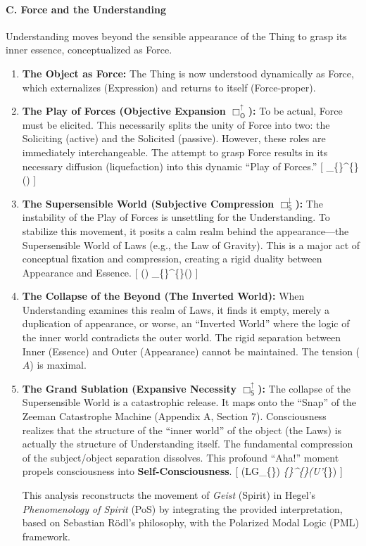 \paragraph{C. Force and the Understanding}\label{c.-force-and-the-understanding}

Understanding moves beyond the sensible appearance of the Thing to grasp its inner essence, conceptualized as Force.

\begin{enumerate}
\def\labelenumi{\arabic{enumi}.}
\item
  \textbf{The Object as Force:} The Thing is now understood dynamically as Force, which externalizes (Expression) and returns to itself (Force-proper).
\item
  \textbf{The Play of Forces (Objective Expansion \(\Box_{\mathsf{O}}^{\uparrow}\)):} To be actual, Force must be elicited. This necessarily splits the unity of Force into two: the Soliciting (active) and the Solicited (passive). However, these roles are immediately interchangeable. The attempt to grasp Force results in its necessary diffusion (liquefaction) into this dynamic ``Play of Forces.'' {[} \Box\_\{\}\^{}\{\uparrow\}() {]}
\item
  \textbf{The Supersensible World (Subjective Compression \(\Box_{\mathsf{S}}^{\downarrow}\)):} The instability of the Play of Forces is unsettling for the Understanding. To stabilize this movement, it posits a calm realm behind the appearance---the Supersensible World of Laws (e.g., the Law of Gravity). This is a major act of conceptual fixation and compression, creating a rigid duality between Appearance and Essence. {[} () \implies \Box\_\{\}\^{}\{\downarrow\}() {]}
\item
  \textbf{The Collapse of the Beyond (The Inverted World):} When Understanding examines this realm of Laws, it finds it empty, merely a duplication of appearance, or worse, an ``Inverted World'' where the logic of the inner world contradicts the outer world. The rigid separation between Inner (Essence) and Outer (Appearance) cannot be maintained. The tension (\(A\)) is maximal.
\item
  \textbf{The Grand Sublation (Expansive Necessity \(\Box_{\mathsf{S}}^{\uparrow}\)):} The collapse of the Supersensible World is a catastrophic release. It maps onto the ``Snap'' of the Zeeman Catastrophe Machine (Appendix A, Section 7). Consciousness realizes that the structure of the ``inner world'' of the object (the Laws) is actually the structure of Understanding itself. The fundamental compression of the subject/object separation dissolves. This profound ``Aha!'' moment propels consciousness into \textbf{Self-Consciousness}. {[} (LG\_\{\}) \implies \Box\emph{\{\}\^{}\{\uparrow\}(U'}\{\}) {]}

  This analysis reconstructs the movement of \emph{Geist} (Spirit) in Hegel's \emph{Phenomenology of Spirit} (PoS) by integrating the provided interpretation, based on Sebastian Rödl's philosophy, with the Polarized Modal Logic (PML) framework.
\end{enumerate}

